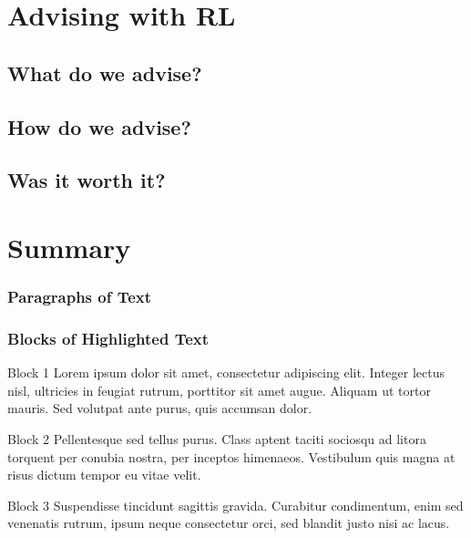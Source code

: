 \documentclass{beamer}
\begin{document}

\section{Advising with RL}

\subsection{What do we advise?}

\subsection{How do we advise?}

\subsection{Was it worth it?}

\section{Summary}

\begin{frame}
\frametitle{Paragraphs of Text}
\end{frame}



\begin{frame}
\frametitle{Blocks of Highlighted Text}
\begin{block}{Block 1}
Lorem ipsum dolor sit amet, consectetur adipiscing elit. Integer lectus nisl, ultricies in feugiat rutrum, porttitor sit amet augue. Aliquam ut tortor mauris. Sed volutpat ante purus, quis accumsan dolor.
\end{block}

\begin{block}{Block 2}
Pellentesque sed tellus purus. Class aptent taciti sociosqu ad litora torquent per conubia nostra, per inceptos himenaeos. Vestibulum quis magna at risus dictum tempor eu vitae velit.
\end{block}

\begin{block}{Block 3}
Suspendisse tincidunt sagittis gravida. Curabitur condimentum, enim sed venenatis rutrum, ipsum neque consectetur orci, sed blandit justo nisi ac lacus.
\end{block}
\end{frame}
\end{document}
